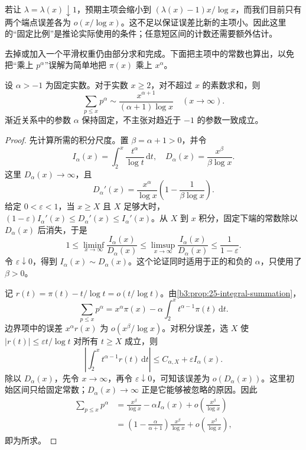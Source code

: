 若让 \(\lambda=\lambda(x)\downarrow1\)，预期主项会缩小到 \((\lambda(x)-1)x/\log x\)，而我们目前只有两个端点误差各为 \(o(x/\log x)\)。这不足以保证误差比新的主项小。因此这里的“固定比例”是推论实际使用的条件；任意短区间的计数还需要额外估计。

\ProseParagraphBreak

去掉或加入一个平滑权重仍由部分求和完成。下面把主项中的常数也算出，以免把“乘上 \(p^\alpha\)”误解为简单地把 \(\pi(x)\) 乘上 \(x^\alpha\)。

\begin{proposition}[素数的幂权和]
\label{b3:prop:27-prime-power-weights}
设 \(\alpha>-1\) 为固定实数。对于实数 \(x\ge2\)，对不超过 \(x\) 的素数求和，则
\[
 \sum_{p\le x}p^\alpha
 \sim\frac{x^{\alpha+1}}{(\alpha+1)\log x}
 \quad(x\to\infty).
\]
渐近关系中的参数 \(\alpha\) 保持固定，不主张对趋近于 \(-1\) 的参数一致成立。
\end{proposition}
\begin{proof}
先计算所需的积分尺度。置 \(\beta=\alpha+1>0\)，并令
\[
 I_\alpha(x)=\int_2^x\frac{t^\alpha}{\log t}\,\mathrm dt,
 \quad D_\alpha(x)=\frac{x^\beta}{\beta\log x}.
\]
这里 \(D_\alpha(x)\to\infty\)，且
\[
 D_\alpha'(x)=\frac{x^\alpha}{\log x}
       \left(1-\frac1{\beta\log x}\right).
\]
给定 \(0<\varepsilon<1\)，当 \(x\ge X\) 且 \(X\) 足够大时，
\((1-\varepsilon)I_\alpha'(x)\le D_\alpha'(x)\le I_\alpha'(x)\)。从 \(X\) 到 \(x\) 积分，固定下端的常数除以 \(D_\alpha(x)\) 后消失，于是
\[
 1\le\liminf_{x\to\infty}\frac{I_\alpha(x)}{D_\alpha(x)}
 \le\limsup_{x\to\infty}\frac{I_\alpha(x)}{D_\alpha(x)}
 \le\frac1{1-\varepsilon}.
\]
令 \(\varepsilon\downarrow0\)，得到 \(I_\alpha(x)\sim D_\alpha(x)\)。这个论证同时适用于正的和负的 \(\alpha\)，只使用了 \(\beta>0\)。

记 \(r(t)=\pi(t)-t/\log t=o(t/\log t)\)。由\cref{b3:prop:25-integral-summation}，
\[
 \sum_{p\le x}p^\alpha
 =x^\alpha\pi(x)-\alpha\int_2^x t^{\alpha-1}\pi(t)\,\mathrm dt.
\]
边界项中的误差 \(x^\alpha r(x)\) 为 \(o(x^\beta/\log x)\)。对积分误差，选 \(X\) 使 \(|r(t)|\le\varepsilon t/\log t\) 对所有 \(t\ge X\) 成立，则
\[
 \left|\int_2^x t^{\alpha-1}r(t)\,\mathrm dt\right|
 \le C_{\alpha,X}+\varepsilon I_\alpha(x).
\]
除以 \(D_\alpha(x)\)，先令 \(x\to\infty\)，再令 \(\varepsilon\downarrow0\)，可知该误差为 \(o(D_\alpha(x))\)。这里初始区间只给固定常数；\(D_\alpha(x)\to\infty\) 正是它能够被忽略的原因。因此
\[
 \begin{aligned}
 \sum_{p\le x}p^\alpha
 &=\frac{x^\beta}{\log x}-\alpha I_\alpha(x)
           +o\!\left(\frac{x^\beta}{\log x}\right)\\
 &=\left(1-\frac\alpha{\alpha+1}\right)
      \frac{x^\beta}{\log x}
           +o\!\left(\frac{x^\beta}{\log x}\right),
 \end{aligned}
\]
即为所求。
\end{proof}

